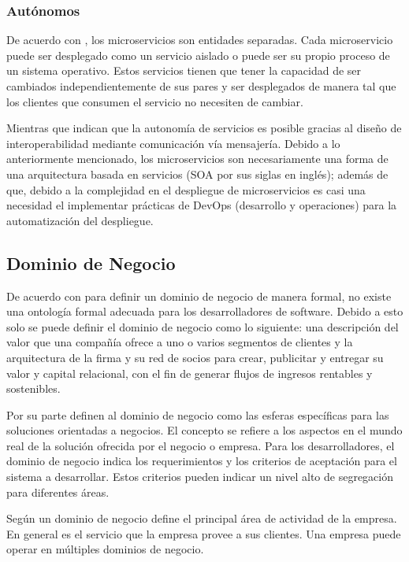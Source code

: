 \subsubsection{Autónomos}

De acuerdo con \cite{newman2019monolith}, los microservicios son entidades separadas.
Cada microservicio puede ser desplegado como un servicio aislado o puede ser su propio proceso
de un sistema operativo.
Estos servicios tienen que tener la capacidad de ser cambiados independientemente de sus pares
y ser desplegados de manera tal que los clientes que consumen el servicio no necesiten de cambiar.

Mientras que \cite{nadareishvili2016microservice} indican que la autonomía de servicios es posible
gracias al diseño de interoperabilidad mediante comunicación vía mensajería.
Debido a lo anteriormente mencionado, los microservicios son necesariamente una forma de una
arquitectura basada en servicios (SOA por sus siglas en inglés); además de que, debido a la
complejidad en el despliegue de microservicios es casi una necesidad el implementar prácticas de
DevOps (desarrollo y operaciones) para la automatización del despliegue.


\subsection{Dominio de Negocio}

De acuerdo con \cite{bosselmann2014domain} para definir un dominio de negocio de manera formal,
no existe una ontología formal adecuada para los desarrolladores de software.
Debido a esto solo se puede definir el dominio de negocio como lo siguiente: una descripción
del valor que una compañía ofrece a uno o varios segmentos de clientes y la arquitectura de
la firma y su red de socios para crear, publicitar y entregar su valor y capital relacional,
con el fin de generar flujos de ingresos rentables y sostenibles.

Por su parte \cite{heidari2021ontology} definen al dominio de negocio como las esferas específicas
para las soluciones orientadas a negocios.
El concepto se refiere a los aspectos en el mundo real de la solución ofrecida por el negocio o empresa.
Para los desarrolladores, el dominio de negocio indica los requerimientos y los criterios de aceptación
para el sistema a desarrollar.
Estos criterios pueden indicar un nivel alto de segregación para diferentes áreas.

Según \cite{khononov2021learning} un dominio de negocio define el principal área de actividad de
la empresa. En general es el servicio que la empresa provee a sus clientes.
Una empresa puede operar en múltiples dominios de negocio.


